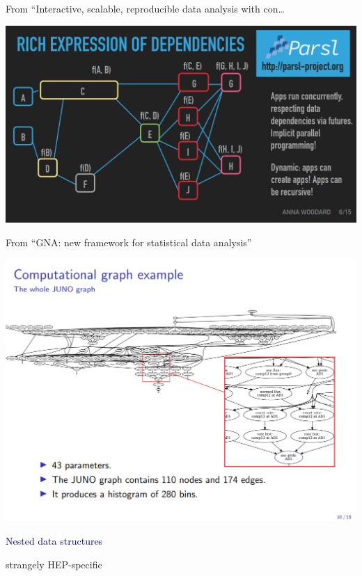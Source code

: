 \documentclass[aspectratio=169]{beamer}
\begin{document}
\begin{frame}{From ``Interactive, scalable, reproducible data analysis with con\ldots}
\begin{center}
\includegraphics[width=\linewidth]{parsl.png}
\end{center}
\end{frame}

\begin{frame}{From ``GNA: new framework for statistical data analysis''}
\begin{center}
\includegraphics[width=0.75\linewidth]{juno.png}
\end{center}
\end{frame}

\begin{frame}{}
\huge
\vspace{0.5 cm}
\begin{center}
\textcolor{darkblue}{Nested data structures}

\large
\vspace{0.5 cm}
strangely HEP-specific
\end{center}
\end{frame}
\end{document}
